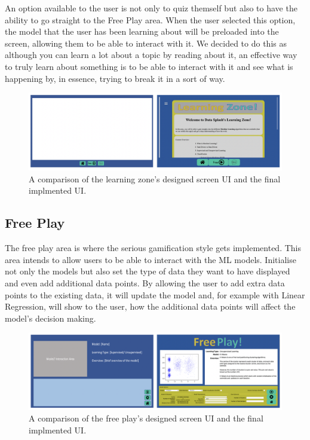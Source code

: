 	An option available to the user is not only to quiz themself but also to have the ability to go straight to the Free Play area. When the user selected this option, the model that the user has been learning about will be preloaded into the screen, allowing them to be able to interact with it. We decided to do this as although you can learn a lot about a topic by reading about it, an effective way to truly learn about something is to be able to interact with it and see what is happening by, in essence, trying to break it in a sort of way.
	
	\begin{figure}[t]
		\includegraphics[width=15cm]{graphics/learning_zone.png}
		\caption{A comparison of the learning zone's designed screen UI and the final implmented UI.}
		\label{fig:ui_lz}
	\end{figure}
	
	\subsection{Free Play}
	
	The free play area is where the serious gamification style gets implemented. This area intends to allow users to be able to interact with the ML models. Initialise not only the models but also set the type of data they want to have displayed and even add additional data points. By allowing the user to add extra data points to the existing data, it will update the model and, for example with Linear Regression, will show to the user, how the additional data points will affect the model's decision making.
	
	\begin{figure}[t]
		\includegraphics[width=15cm]{graphics/free_play.png}
		\caption{A comparison of the free play's designed screen UI and the final implmented UI.}
		\label{fig:ui_fp}
	\end{figure}
	

